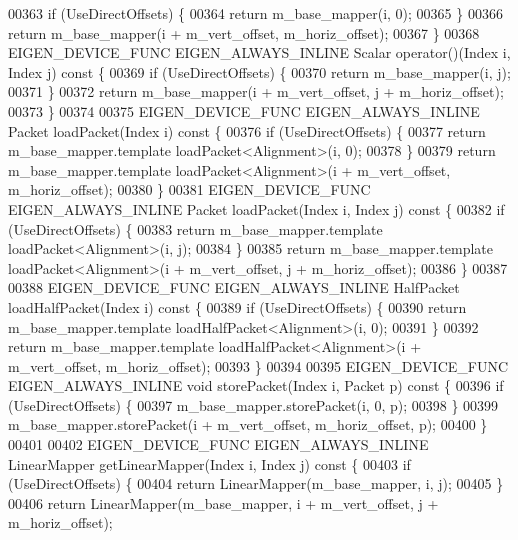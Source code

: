 \begin{DoxyCode}
00363     \textcolor{keywordflow}{if} (UseDirectOffsets) \{
00364       \textcolor{keywordflow}{return} m\_base\_mapper(i, 0);
00365     \}
00366     \textcolor{keywordflow}{return} m\_base\_mapper(i + m\_vert\_offset, m\_horiz\_offset);
00367   \}
00368   EIGEN\_DEVICE\_FUNC EIGEN\_ALWAYS\_INLINE Scalar operator()(Index i, Index j)\textcolor{keyword}{ const }\{
00369     \textcolor{keywordflow}{if} (UseDirectOffsets) \{
00370       \textcolor{keywordflow}{return} m\_base\_mapper(i, j);
00371     \}
00372     \textcolor{keywordflow}{return} m\_base\_mapper(i + m\_vert\_offset, j + m\_horiz\_offset);
00373   \}
00374 
00375   EIGEN\_DEVICE\_FUNC EIGEN\_ALWAYS\_INLINE Packet loadPacket(Index i)\textcolor{keyword}{ const }\{
00376     \textcolor{keywordflow}{if} (UseDirectOffsets) \{
00377       \textcolor{keywordflow}{return} m\_base\_mapper.template loadPacket<Alignment>(i, 0);
00378     \}
00379     \textcolor{keywordflow}{return} m\_base\_mapper.template loadPacket<Alignment>(i + m\_vert\_offset, m\_horiz\_offset);
00380   \}
00381   EIGEN\_DEVICE\_FUNC EIGEN\_ALWAYS\_INLINE Packet loadPacket(Index i, Index j)\textcolor{keyword}{ const }\{
00382     \textcolor{keywordflow}{if} (UseDirectOffsets) \{
00383       \textcolor{keywordflow}{return} m\_base\_mapper.template loadPacket<Alignment>(i, j);
00384     \}
00385     \textcolor{keywordflow}{return} m\_base\_mapper.template loadPacket<Alignment>(i + m\_vert\_offset, j + m\_horiz\_offset);
00386   \}
00387 
00388   EIGEN\_DEVICE\_FUNC EIGEN\_ALWAYS\_INLINE HalfPacket loadHalfPacket(Index i)\textcolor{keyword}{ const }\{
00389     \textcolor{keywordflow}{if} (UseDirectOffsets) \{
00390       \textcolor{keywordflow}{return} m\_base\_mapper.template loadHalfPacket<Alignment>(i, 0);
00391     \}
00392     \textcolor{keywordflow}{return} m\_base\_mapper.template loadHalfPacket<Alignment>(i + m\_vert\_offset, m\_horiz\_offset);
00393   \}
00394 
00395   EIGEN\_DEVICE\_FUNC EIGEN\_ALWAYS\_INLINE \textcolor{keywordtype}{void} storePacket(Index i, Packet p)\textcolor{keyword}{ const }\{
00396     \textcolor{keywordflow}{if} (UseDirectOffsets) \{
00397       m\_base\_mapper.storePacket(i, 0, p);
00398     \}
00399     m\_base\_mapper.storePacket(i + m\_vert\_offset, m\_horiz\_offset, p);
00400   \}
00401 
00402   EIGEN\_DEVICE\_FUNC EIGEN\_ALWAYS\_INLINE LinearMapper getLinearMapper(Index i, Index j)\textcolor{keyword}{ const }\{
00403     \textcolor{keywordflow}{if} (UseDirectOffsets) \{
00404       \textcolor{keywordflow}{return} LinearMapper(m\_base\_mapper, i, j);
00405     \}
00406     \textcolor{keywordflow}{return} LinearMapper(m\_base\_mapper, i + m\_vert\_offset, j + m\_horiz\_offset);

\end{DoxyCode}
